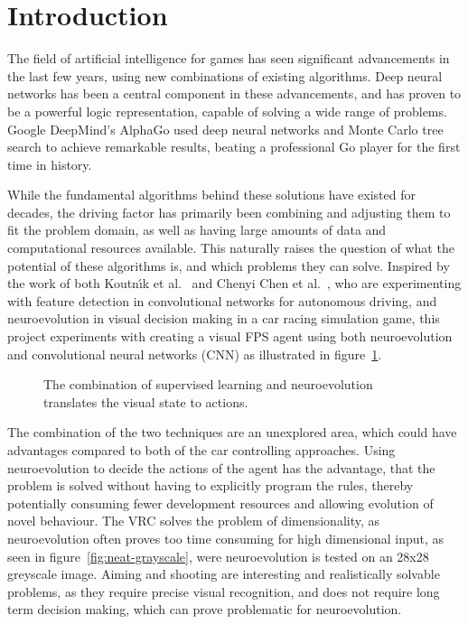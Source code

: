 
\section{Introduction}
The field of artificial intelligence for games has seen significant advancements in the last few years, using new combinations of existing algorithms. Deep neural networks has been a central component in these advancements, and has proven to be a powerful logic representation, capable of solving a wide range of problems. Google DeepMind's AlphaGo\cite{christian} used deep neural networks and Monte Carlo tree search to achieve remarkable results, beating a professional Go player for the first time in history.

While the fundamental algorithms behind these solutions have existed for decades, the driving factor has primarily been combining and adjusting them to fit the problem domain, as well as having large amounts of data and computational resources available. This naturally raises the question of what the potential of these algorithms is, and which problems they can solve. Inspired by the work of both Koutn\'{\i}k et al.~\cite{torcs} and Chenyi Chen et al.~\cite{chen}, who are experimenting with feature detection in convolutional networks for autonomous driving, and neuroevolution in visual decision making in a car racing simulation game, this project experiments with creating a visual FPS agent using both neuroevolution and convolutional neural networks (CNN) as illustrated in figure~\ref{fig:architecture}.

\begin{figure}[h]
	\begin{scriptsize}
		\sffamily
		\def\svgwidth{\textwidth}
		
		\vspace{-45mm}
	\end{scriptsize}
	\caption[Overview of the architecture of the solution]{The combination of supervised learning and neuroevolution translates the visual state to actions.}
	\label{fig:architecture}
\end{figure}

The combination of the two techniques are an unexplored area, which could have advantages compared to both of the car controlling approaches. Using neuroevolution to decide the actions of the agent has the advantage, that the problem is solved without having to explicitly program the rules, thereby potentially consuming fewer development resources and allowing evolution of novel behaviour. The VRC solves the problem of dimensionality, as neuroevolution often proves too time consuming for high dimensional input, as seen in figure~\ref{fig:neat-grayscale}, were neuroevolution is tested on an 28x28 greyscale image. Aiming and shooting are interesting and realistically solvable problems, as they require precise visual recognition, and does not require long term decision making, which can prove problematic for neuroevolution.

